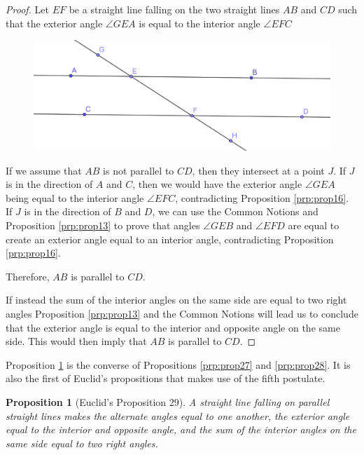 \documentclass[
]{book}
\newtheorem{proposition}{Proposition}[chapter]
\theoremstyle{definition}
\theoremstyle{definition}
\theoremstyle{definition}
\theoremstyle{definition}
\theoremstyle{remark}
\begin{document}
\begin{proof}
Let \(EF\) be a straight line falling on the two straight lines \(AB\) and \(CD\) such that the exterior angle \(\angle GEA\) is equal to the interior angle \(\angle EFC\)

\begin{figure}

{\centering \includegraphics[width=0.75\linewidth]{images/Prop28} 

}

\end{figure}

If we assume that \(AB\) is not parallel to \(CD\), then they intersect at a point \(J\). If \(J\) is in the direction of \(A\) and \(C\), then we would have the exterior angle \(\angle GEA\) being equal to the interior angle \(\angle EFC\), contradicting Proposition \ref{prp:prop16}. If \(J\) is in the direction of \(B\) and \(D\), we can use the Common Notions and Proposition \ref{prp:prop13} to prove that angles \(\angle GEB\) and \(\angle EFD\) are equal to create an exterior angle equal to an interior angle, contradicting Proposition \ref{prp:prop16}.

Therefore, \(AB\) is parallel to \(CD\).

If instead the sum of the interior angles on the same side are equal to two right angles Proposition \ref{prp:prop13} and the Common Notions will lead us to conclude that the exterior angle is equal to the interior and opposite angle on the same side. This would then imply that \(AB\) is parallel to \(CD\).
\end{proof}

Proposition \ref{prp:prop29} is the converse of Propositions \ref{prp:prop27} and \ref{prp:prop28}. It is also the first of Euclid's propositions that makes use of the fifth postulate.

\begin{proposition}[Euclid's Proposition 29]
\protect\hypertarget{prp:prop29}{}\label{prp:prop29}A straight line falling on parallel straight lines makes the alternate angles equal to one another, the exterior angle equal to the interior and opposite angle, and the sum of the interior angles on the same side equal to two right angles.
\end{proposition}
\end{document}
